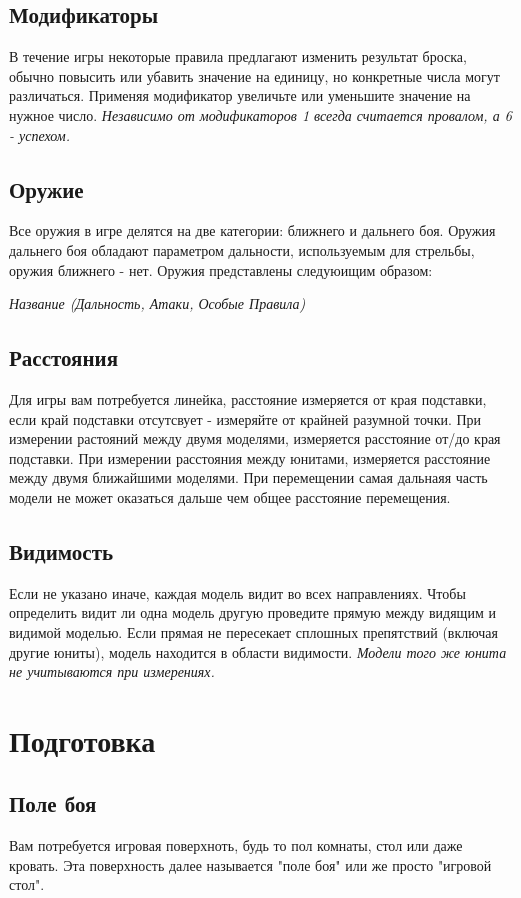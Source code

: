 \documentclass[twocolumn]{article}
\begin{document}
\subsection{Модификаторы}
В течение игры некоторые правила предлагают изменить результат броска, обычно повысить или убавить значение на единицу, но конкретные числа могут различаться. Применяя модификатор увеличьте или уменьшите значение на нужное число. \emph{Независимо от модификаторов 1 всегда считается провалом, а 6 - успехом.}

\subsection{Оружие}
Все оружия в игре делятся на две категории: ближнего и дальнего боя. Оружия дальнего боя обладают параметром дальности, используемым для стрельбы, оружия ближнего - нет. Оружия представлены следуюищим образом:
\begin{center}
    \textit{Название (Дальность, Атаки, Особые Правила)}
\end{center}

\subsection{Расстояния}
Для игры вам потребуется линейка, расстояние измеряется от края подставки, если край подставки отсутсвует - измеряйте от крайней разумной точки. При измерении растояний между двумя моделями, измеряется расстояние от/до края подставки. При измерении расстояния между юнитами, измеряется расстояние между двумя ближайшими моделями. При перемещении самая дальнаяя часть модели не может оказаться дальше чем общее расстояние перемещения.

\subsection{Видимость}
Если не указано иначе, каждая модель видит во всех направлениях. Чтобы определить видит ли одна модель другую проведите прямую между видящим и видимой моделью. Если прямая не пересекает сплошных препятствий (включая другие юниты), модель находится в области видимости. \emph{Модели того же юнита не учитываются при измерениях.}

\newpage

\section{Подготовка}
\subsection{Поле боя}
Вам потребуется игровая поверхноть, будь то пол комнаты, стол или даже кровать. Эта поверхность далее называется "поле боя" или же просто "игровой стол".
\end{document}
